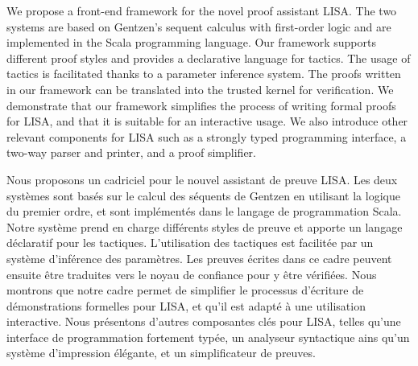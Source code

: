 \newenvironment{abstractpage}
  {\cleardoublepage\vspace*{\fill}\thispagestyle{plain}}
  {\vfill\cleardoublepage}
\newenvironment{i18nabstract}[1]
  {\bigskip\selectlanguage{#1}%
   \begin{center}\bfseries\abstractname\end{center}}
  {\par\bigskip}

\begin{abstractpage}
\begin{i18nabstract}{english}
  We propose a front-end framework for the novel proof assistant LISA. The two systems are based on Gentzen's sequent calculus with first-order logic and are implemented in the Scala programming language. Our framework supports different proof styles and provides a declarative language for tactics. The usage of tactics is facilitated thanks to a parameter inference system. The proofs written in our framework can be translated into the trusted kernel for verification. We demonstrate that our framework simplifies the process of writing formal proofs for LISA, and that it is suitable for an interactive usage. We also introduce other relevant components for LISA such as a strongly typed programming interface, a two-way parser and printer, and a proof simplifier.
\end{i18nabstract}

\begin{i18nabstract}{french}
  Nous proposons un cadriciel pour le nouvel assistant de preuve LISA. Les deux systèmes sont basés sur le calcul des séquents de Gentzen en utilisant la logique du premier ordre, et sont implémentés dans le langage de programmation Scala. Notre système prend en charge différents styles de preuve et apporte un langage déclaratif pour les tactiques. L'utilisation des tactiques est facilitée par un système d'inférence des paramètres. Les preuves écrites dans ce cadre peuvent ensuite être traduites vers le noyau de confiance pour y être vérifiées. Nous montrons que notre cadre permet de simplifier le processus d'écriture de démonstrations formelles pour LISA, et qu'il est adapté à une utilisation interactive. Nous présentons d'autres composantes clés pour LISA, telles qu'une interface de programmation fortement typée, un analyseur syntactique ains qu'un système d'impression élégante, et un simplificateur de preuves.
\end{i18nabstract}
\end{abstractpage}
